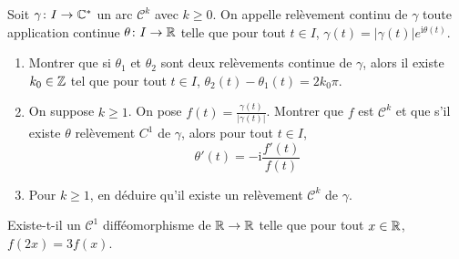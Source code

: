 \documentclass[12pt]{article}
\begin{document}
\begin{exercise}
	Soit $\gamma\colon I\to\mathbb{C}^{*}$ un arc $\mathcal{C}^{k}$ avec $k\geqslant0$. On appelle relèvement continu de $\gamma$ toute application continue $\theta\colon I\to\mathbb{R}$ telle que pour tout $t\in I$, $\gamma(t)=\vert\gamma(t)\vert e^{\mathrm{i}\theta(t)}$.
	\begin{enumerate}
		\item Montrer que si $\theta_{1}$ et $\theta_{2}$ sont deux relèvements continue de $\gamma$, alors il existe $k_{0}\in\mathbb{Z}$ tel que pour tout $t\in I$, $\theta_{2}(t)-\theta_{1}(t)=2k_{0}\pi$.
		\item On suppose $k\geqslant1$. On pose $f(t)=\frac{\gamma(t)}{\vert\gamma(t)\vert}$. Montrer que $f$ est $\mathcal{C}^{k}$ et que s'il existe $\theta$ relèvement $C^{1}$ de $\gamma$, alors pour tout $t\in I$, 
		$$\theta'(t)=-\mathrm{i}\frac{f'(t)}{f(t)}$$
		\item Pour $k\geqslant1$, en déduire qu'il existe un relèvement $\mathcal{C}^{k}$ de $\gamma$.
	\end{enumerate}
\end{exercise}

\begin{exercise}
	Existe-t-il un $\mathcal{C}^{1}$ difféomorphisme de $\mathbb{R}\to\mathbb{R}$ telle que pour tout $x\in\mathbb{R}$, $f(2x)=3f(x)$.
\end{exercise}
\end{document}
